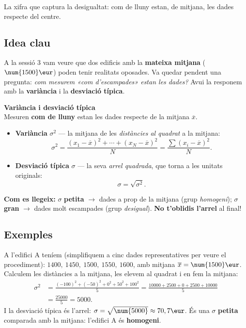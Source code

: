 %
{La xifra que captura la desigualtat: com de lluny estan, de mitjana, les dades respecte del centre.}

\subsection{Idea clau}

A la sessió 3 vam veure que dos edificis amb la \textbf{mateixa mitjana}
($\num{1500}\eur$) poden tenir realitats oposades. Va quedar pendent una pregunta:
\emph{com mesurem «com d'escampades» estan les dades?} Avui la responem amb la
\textbf{variància} i la \textbf{desviació típica}.

\begin{idea}
\textbf{Variància i desviació típica}\\
Mesuren \textbf{com de lluny} estan les dades respecte de la mitjana $\overline{x}$.
\begin{itemize}[leftmargin=1.4em, itemsep=3pt]
  \item \textbf{Variància} $\sigma^2$ — la mitjana de les \emph{distàncies al quadrat}
        a la mitjana:
        \[
        \sigma^2=\frac{(x_1-\overline{x})^2+\cdots+(x_N-\overline{x})^2}{N}
        =\frac{\sum (x_i-\overline{x})^2}{N}.
        \]
  \item \textbf{Desviació típica} $\sigma$ — la seva \emph{arrel quadrada}, que torna
        a les unitats originals:
        \[
        \sigma=\sqrt{\sigma^2}.
        \]
\end{itemize}
\textbf{Com es llegeix:} $\sigma$ \textbf{petita} $\rightarrow$ dades a prop de la
mitjana (grup \emph{homogeni}); $\sigma$ \textbf{gran} $\rightarrow$ dades molt
escampades (grup \emph{desigual}). \textbf{No t'oblidis l'arrel} al final!
\end{idea}

\subsection{Exemples}

\begin{exemple}
A l'edifici A teníem (simplifiquem a cinc dades representatives per veure el
procediment): $\num{1400},\ \num{1450},\ \num{1500},\ \num{1550},\ \num{1600}$, amb
mitjana $\overline{x}=\num{1500}\eur$. Calculem les distàncies a la mitjana, les
elevem al quadrat i en fem la mitjana:
\[
\begin{aligned}
\sigma^2&=\frac{(-100)^2+(-50)^2+0^2+50^2+100^2}{5}
=\frac{\num{10000}+\num{2500}+0+\num{2500}+\num{10000}}{5}\\[2pt]
&=\frac{\num{25000}}{5}=\num{5000}.
\end{aligned}
\]
I la desviació típica és l'arrel: $\sigma=\sqrt{\num{5000}}\approx 70,7\eur$. És una
$\sigma$ \textbf{petita} comparada amb la mitjana: l'edifici A és \textbf{homogeni}.
\end{exemple}

